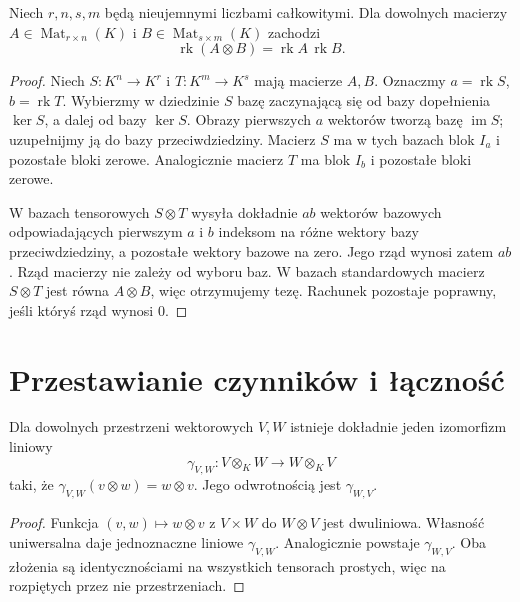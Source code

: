 \begin{twierdzenie}
\label{thm:lin10-rzad-kronecker}
Niech \(r,n,s,m\) będą
nieujemnymi liczbami całkowitymi.
Dla dowolnych macierzy
\(A\in\operatorname{Mat}_{r\times n}(K)\)
i \(B\in\operatorname{Mat}_{s\times m}(K)\)
zachodzi
\[
 \operatorname{rk}(A\otimes B)
 =\operatorname{rk}A\,\operatorname{rk}B.
\]
\end{twierdzenie}
\begin{proof}
Niech \(S\colon K^n\to K^r\)
i \(T\colon K^m\to K^s\)
mają macierze \(A,B\).
Oznaczmy
\(a=\operatorname{rk}S\),
\(b=\operatorname{rk}T\).
Wybierzmy w dziedzinie \(S\)
bazę zaczynającą się od
bazy dopełnienia \(\ker S\),
a dalej od bazy \(\ker S\).
Obrazy pierwszych \(a\) wektorów
tworzą bazę \(\operatorname{im}S\);
uzupełnijmy ją do bazy
przeciwdziedziny.
Macierz \(S\) ma w tych bazach
blok \(I_a\) i pozostałe
bloki zerowe. Analogicznie
macierz \(T\) ma blok \(I_b\)
i pozostałe bloki zerowe.

W bazach tensorowych
\(S\otimes T\) wysyła
dokładnie \(ab\) wektorów
bazowych odpowiadających
pierwszym \(a\) i \(b\)
indeksom na różne wektory
bazy przeciwdziedziny,
a pozostałe wektory bazowe
na zero. Jego rząd wynosi
zatem \(ab\).
Rząd macierzy nie zależy
od wyboru baz.
W bazach standardowych
macierz \(S\otimes T\)
jest równa \(A\otimes B\),
więc otrzymujemy tezę.
Rachunek pozostaje poprawny,
jeśli któryś rząd wynosi \(0\).
\end{proof}

\section{Przestawianie czynników i łączność}
\label{sec:lin10-kanoniczne}

\begin{twierdzenie}
\label{thm:lin10-zamiana}
Dla dowolnych przestrzeni
wektorowych \(V,W\) istnieje
dokładnie jeden izomorfizm liniowy
\[
 \gamma_{V,W}\colon V\otimes_KW\to W\otimes_KV
\]
taki, że
\(\gamma_{V,W}(v\otimes w)=w\otimes v\).
Jego odwrotnością jest \(\gamma_{W,V}\).
\end{twierdzenie}
\begin{proof}
Funkcja \((v,w)\mapsto w\otimes v\)
z \(V\times W\) do \(W\otimes V\)
jest dwuliniowa.
Własność uniwersalna daje
jednoznaczne liniowe \(\gamma_{V,W}\).
Analogicznie powstaje \(\gamma_{W,V}\).
Oba złożenia są identycznościami
na wszystkich tensorach prostych,
więc na rozpiętych przez nie
przestrzeniach.
\end{proof}

